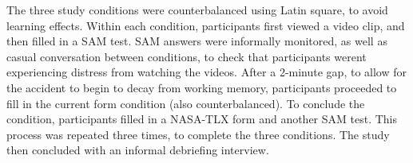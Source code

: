 \documentclass[../main/Feedback.tex]{subfiles}
\begin{document}
The three study conditions were counterbalanced using Latin square, to avoid learning effects. Within each condition, participants first viewed a video clip, and then filled in a SAM test. SAM answers were informally monitored, as well as casual conversation between conditions, to check that participants werent experiencing distress from watching the videos. After a 2-minute gap, to allow for the accident to begin to decay from working memory, participants proceeded to fill in the current form condition (also counterbalanced). To conclude the condition, participants filled in a NASA-TLX form and another SAM test. 
This process was repeated three times, to complete the three conditions.%
The study then concluded with an informal debriefing interview.
\end{document}
